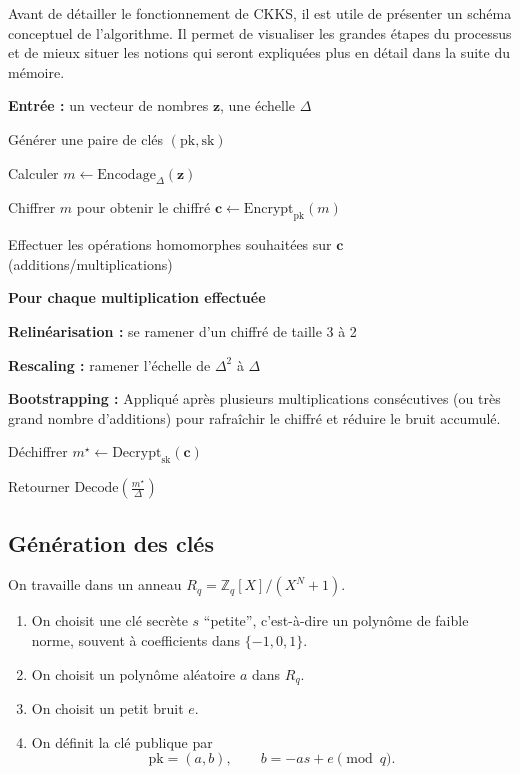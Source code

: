 Avant de détailler le fonctionnement de CKKS, il est utile de présenter un schéma conceptuel de l’algorithme. Il permet de visualiser les grandes étapes du processus et de mieux situer les notions qui seront expliquées plus en détail dans la suite du mémoire.

\begin{algorithm}[htbp]
\caption{Schéma conceptuel de CKKS}
\begin{algorithmic}[1]

\State \textbf{Entrée :} un vecteur de nombres $\mathbf{z}$, une échelle $\Delta$

\State Générer une paire de clés $(\mathrm{pk}, \mathrm{sk})$

\State Calculer $m \leftarrow \mathrm{Encodage}_{\Delta}(\mathbf{z})$

\State Chiffrer $m$ pour obtenir le chiffré $\mathbf{c} \leftarrow \mathrm{Encrypt}_{\mathrm{pk}}(m)$

\State Effectuer les opérations homomorphes souhaitées sur $\mathbf{c}$ (additions/multiplications)

\hspace{-0.95cm} \textbf{Pour chaque multiplication effectuée}

\State \hspace{0.5cm} \textbf{Relinéarisation :} se ramener d'un chiffré de taille 3 à 2

\State \hspace{0.5cm} \textbf{Rescaling :} ramener l'échelle de $\Delta^2$ à $\Delta$

\State \textbf{Bootstrapping :} Appliqué après plusieurs multiplications consécutives (ou très grand nombre d'additions) pour rafraîchir le chiffré et réduire le bruit accumulé.

\State Déchiffrer $m^\star \leftarrow \mathrm{Decrypt}_{\mathrm{sk}}(\mathbf{c})$

\State Retourner $\mathrm{Decode}\left(\frac{m^\star}{\Delta}\right)$

\end{algorithmic}
\end{algorithm}

\subsection{Génération des clés}

On travaille dans un anneau $R_q=\mathbb{Z}_q[X]/(X^N+1)$.

\begin{enumerate}[leftmargin=2em]
  \item On choisit une clé secrète $s$ ``petite'', c'est-à-dire un polynôme de faible norme, souvent à coefficients dans $\{-1,0,1\}$.
  \item On choisit un polynôme aléatoire $a$ dans $R_q$.
  \item On choisit un petit bruit $e$.
  \item On définit la clé publique par
  \[
  \text{pk}=(a,b),\qquad b=-a s + e \pmod q.
  \]
\end{enumerate}

